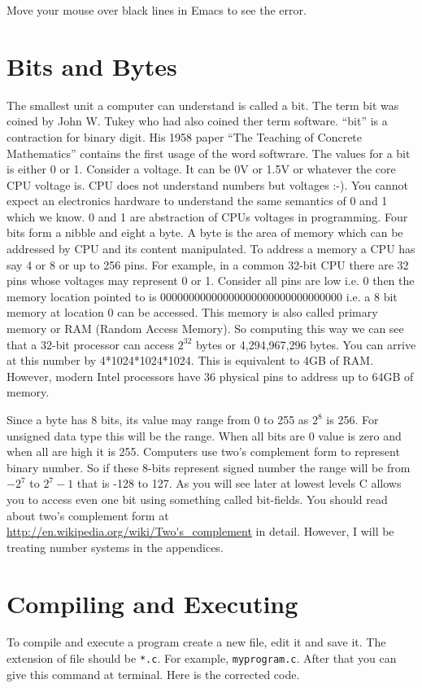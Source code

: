 Move your mouse over black lines in Emacs to see the error.

\section{Bits and Bytes}
The smallest unit a computer can understand is called a bit. The term bit 
was coined by John W. Tukey who had also coined ther term software. ``bit'' 
is a contraction for binary digit. His 1958 paper ``The Teaching of Concrete 
Mathematics'' contains the first usage of the word softwrare. The values for a
bit is either 0 or 1. Consider a voltage. It can be 0V or 1.5V or whatever the
core CPU voltage is. CPU does not understand numbers but voltages :-). You
cannot expect an electronics hardware to understand the same semantics of 0 and
1 which we know. 0 and 1 are abstraction of CPUs voltages in programming. Four
bits form a nibble and eight a byte. A byte is the area of memory which
can be addressed by CPU and its content manipulated. To address a memory a CPU
has say 4 or 8 or up to 256 pins. For example, in a common 32-bit CPU there are
32 pins whose voltages may represent 0 or 1. Consider all pins are low i.e. 0
then the memory location pointed to is 00000000000000000000000000000000 i.e. a
8 bit memory at location 0 can be accessed. This memory is also called primary
memory or RAM (Random Access Memory). So computing this way we can see that a
32-bit processor can access $2^{32}$ bytes or 4,294,967,296 bytes. You can
arrive at this number by 4*1024*1024*1024. This is equivalent to 4GB of
RAM. However, modern Intel processors have 36 physical pins to address up to
64GB of memory.

Since a byte has 8 bits, its value may range from 0 to 255 as $2^8$ is 256. For
unsigned data type this will be the range. When all bits are 0 value is zero
and when all are high it is 255. Computers use two's complement form to
represent binary number. So if these 8-bits represent signed number the range
will be from $-2^7$ to $2^7-1$ that is -128 to 127. As you will see later at
lowest levels C allows you to access even one bit using something called
bit-fields. You should read about two's complement form at
\url{http://en.wikipedia.org/wiki/Two's\_complement} in detail. However, I will
be treating number systems in the appendices.

\section{Compiling and Executing}
To compile and execute a program create a new file, edit it and save it. The
extension of file should be \texttt{*.c}. For example,
\texttt{myprogram.c}. After that you can give this command at terminal. Here is
the corrected code.

